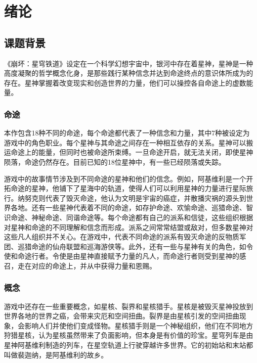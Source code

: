 \chapter{绪论}
\vspace{7pt}


\section{课题背景}

《崩坏：星穹铁道》设定在一个科学幻想宇宙中\cite{exampleid1}，银河中存在着星神，星神是一种高度凝聚的哲学概念化身，是那些践行某种信念并达到命途终点的意识体所成为的存在。星神掌握着改变现实和创造世界的力量，他们可以操控各自命途上的虚数能量。

\subsection{命途}

本作包含18种不同的命途，每个命途都代表了一种信念和力量，其中7种被设定为游戏中的角色职业。每个星神与其命途之间存在一种相互依存的关系。星神可以搬运命途上的能量，但同时也被命途所束缚。一旦命途开启，就无法关闭，即使星神陨落，命途仍然存在。目前已知的18位星神中，有一些已经陨落或失踪。

游戏中的故事情节涉及到不同命途的星神和他们的信念。例如，阿基维利是一个开拓命途的星神，他铺下了星海中的轨道，使得人们可以利用星神的力量进行星际旅行。纳努克则代表了毁灭命途，他认为文明是宇宙的癌症，并散播灾祸的源头到世界各地。还有一些星神代表着不同的命途，如存护命途、欢愉命途、巡猎命途、智识命途、神秘命途、同谐命途等。每个命途都有自己的派系和信徒，这些组织根据对星神和命途的不同理解和信念而形成。派系之间常常结盟或敌对，但多数星神对这些凡人组织并不关心。在游戏中，代表不同命途的派系有毁灭命途的反物质军团、巡猎命途的仙舟联盟和巡海游侠等。此外，还有一些与星神有关的角色，如令使和命途行者。令使是由星神直接赋予力量的凡人，而命途行者则受到星神的感召，走在对应的命途上，并从中获得力量和恩赐。

\subsection{概念}

游戏中还存在一些重要概念，如星核、裂界和星核猎手。星核是被毁灭星神投放到世界各地的世界之癌，会带来灾厄和空间扭曲。裂界是由星核引发的空间扭曲现象，会影响人们并使他们变成怪物。星核猎手则是一个神秘组织，他们在不同地方狩猎星核，认为星核虽然带来了负面影响，但本身是有价值的珍宝。星穹列车是由星神阿基维利制造的列车，在星空轨道上行驶穿越许多世界。它的初始站和末站都叫做裴迦纳，是阿基维利的故乡。

